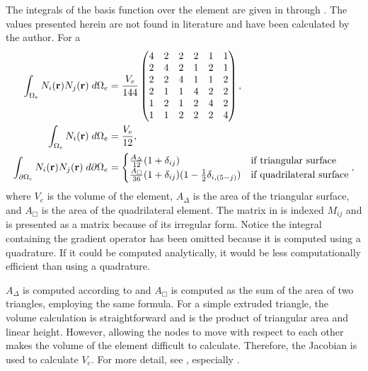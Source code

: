       The integrals of the basis function over the element are given in
       through . The values
      presented herein are not found in literature and have been calculated by
      the author. For a 
      \begin{align}
        \label{eq:bigmat}
        \int_{\Omega_e} N_i(\mathbf{r}) N_j(\mathbf{r}) \;d\Omega_e &= 
          \frac{V_e}{144}
          \begin{pmatrix}
            4 & 2 & 2 & 2 & 1 & 1 \\
            2 & 4 & 2 & 1 & 2 & 1 \\
            2 & 2 & 4 & 1 & 1 & 2 \\
            2 & 1 & 1 & 4 & 2 & 2 \\
            1 & 2 & 1 & 2 & 4 & 2 \\
            1 & 1 & 2 & 2 & 2 & 4 
          \end{pmatrix} ,\\
        \int_{\Omega_e} N_i(\mathbf{r}) \;d\Omega_e &= \frac{V_e}{12} ,\\
        \label{eq:wedge_surface_integral}
        \int_{\partial \Omega_e} N_i(\mathbf{r}) 
          N_j(\mathbf{r}) \;d\partial\Omega_e &= 
          \begin{cases}
            \frac{A_{\Delta}}{12}(1+\delta_{ij})&\text{if triangular surface} \\
            \frac{A_{\Box}}{36}(1+\delta_{ij})(1-\frac{1}{2} \delta_{i,(5-j)}) &
              \text{if quadrilateral surface}
          \end{cases},
      \end{align}
      where $V_e$ is the volume of the element, $A_{\Delta}$ is the area of the
      triangular surface, and $A_{\Box}$ is the area of the quadrilateral
      element. 
      The matrix in  is indexed $M_{ij}$
      and is presented as a matrix because of its irregular form. Notice the 
      integral containing the gradient operator has been omitted because it is
      computed using a quadrature. If it could be computed analytically, it 
      would be less computationally efficient than using a quadrature.
      
      $A_{\Delta}$ is computed according to  and
      $A_{\Box}$ is computed as the sum of the area of two triangles, employing
      the same formula.
      For a simple extruded triangle,
      the volume calculation is straightforward and is the product of triangular
      area and linear height. However, allowing the nodes to
      move with respect to each other makes the volume of the element difficult
      to calculate. Therefore, the Jacobian is used to calculate $V_e$. For more
      detail, see , especially .

